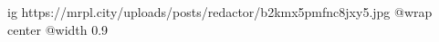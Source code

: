  
 
 
 
 

\ifcmt
  ig https://mrpl.city/uploads/posts/redactor/b2kmx5pmfnc8jxy5.jpg
  @wrap center
  @width 0.9
\fi
